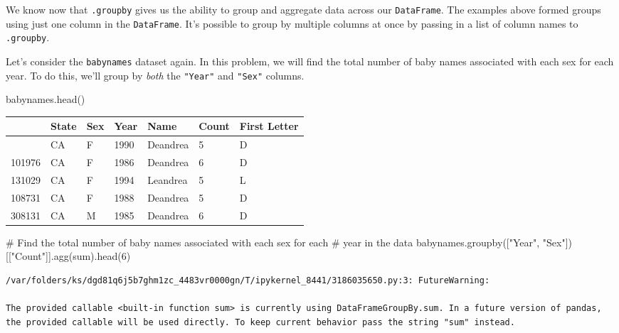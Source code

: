 \documentclass[
  letterpaper,
  DIV=11,
  numbers=noendperiod]{scrreprt}
\newenvironment{Shaded}{\begin{snugshade}}{\end{snugshade}}
\newcommand{\BuiltInTok}[1]{\textcolor[rgb]{0.00,0.23,0.31}{#1}}
\newcommand{\CommentTok}[1]{\textcolor[rgb]{0.37,0.37,0.37}{#1}}
\newcommand{\DecValTok}[1]{\textcolor[rgb]{0.68,0.00,0.00}{#1}}
\newcommand{\NormalTok}[1]{\textcolor[rgb]{0.00,0.23,0.31}{#1}}
\newcommand{\StringTok}[1]{\textcolor[rgb]{0.13,0.47,0.30}{#1}}
\begin{document}
We know now that \texttt{.groupby} gives us the ability to group and
aggregate data across our \texttt{DataFrame}. The examples above formed
groups using just one column in the \texttt{DataFrame}. It's possible to
group by multiple columns at once by passing in a list of column names
to \texttt{.groupby}.

Let's consider the \texttt{babynames} dataset again. In this problem, we
will find the total number of baby names associated with each sex for
each year. To do this, we'll group by \emph{both} the \texttt{"Year"}
and \texttt{"Sex"} columns.

\begin{Shaded}
\begin{Highlighting}[]
\NormalTok{babynames.head()}
\end{Highlighting}
\end{Shaded}

\begin{longtable}[]{@{}lllllll@{}}
\toprule\noalign{}
& State & Sex & Year & Name & Count & First Letter \\
\midrule\noalign{}
\endhead
\bottomrule\noalign{}
\endlastfoot
115957 & CA & F & 1990 & Deandrea & 5 & D \\
101976 & CA & F & 1986 & Deandrea & 6 & D \\
131029 & CA & F & 1994 & Leandrea & 5 & L \\
108731 & CA & F & 1988 & Deandrea & 5 & D \\
308131 & CA & M & 1985 & Deandrea & 6 & D \\
\end{longtable}

\begin{Shaded}
\begin{Highlighting}[]
\CommentTok{\# Find the total number of baby names associated with each sex for each }
\CommentTok{\# year in the data}
\NormalTok{babynames.groupby([}\StringTok{"Year"}\NormalTok{, }\StringTok{"Sex"}\NormalTok{])[[}\StringTok{"Count"}\NormalTok{]].agg(}\BuiltInTok{sum}\NormalTok{).head(}\DecValTok{6}\NormalTok{)}
\end{Highlighting}
\end{Shaded}

\begin{verbatim}
/var/folders/ks/dgd81q6j5b7ghm1zc_4483vr0000gn/T/ipykernel_8441/3186035650.py:3: FutureWarning:

The provided callable <built-in function sum> is currently using DataFrameGroupBy.sum. In a future version of pandas, the provided callable will be used directly. To keep current behavior pass the string "sum" instead.
\end{verbatim}
\end{document}
